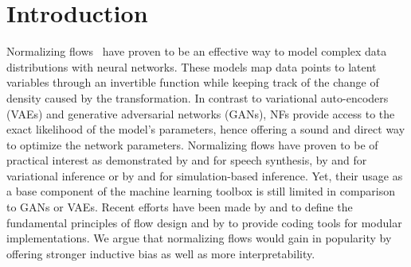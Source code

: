 \documentclass[twoside]{article}
\newcommand{\antoine}[1]{\textcolor{orange}{[AW: #1]}}
\begin{document}
\section{Introduction}
Normalizing flows~\citep[NFs, ][]{NF, tabak2010density, tabak2013family, rippel2013high} have proven to be an effective way to model complex data distributions with neural networks. These models map data points to latent variables through an invertible function while keeping track of the change of density caused by the transformation. In contrast to variational auto-encoders (VAEs) and generative adversarial networks (GANs), NFs provide access to the exact likelihood of the model's parameters, hence offering a sound and direct way to optimize the network parameters. Normalizing flows have proven to be of practical interest as demonstrated by \citet{parallel_wavenet, kim2018flowavenet} and \citet{ prenger2019waveglow} for speech synthesis, by \citet{NF, kingma2016improved} and \citet{berg2018sylvester} for variational inference or by \citet{SNL} and \citet{greenberg2019automatic} for simulation-based inference. Yet, their usage as a base component of the machine learning toolbox is still limited in comparison to GANs or VAEs. Recent efforts have been made by \citet{flows-review} and \citet{flow_review_2} to define the fundamental principles of flow design and by \citet{neural-spline-flows} to provide coding tools for modular implementations. We argue that normalizing flows would gain in popularity by offering stronger inductive bias as well as more interpretability. %
\end{document}
